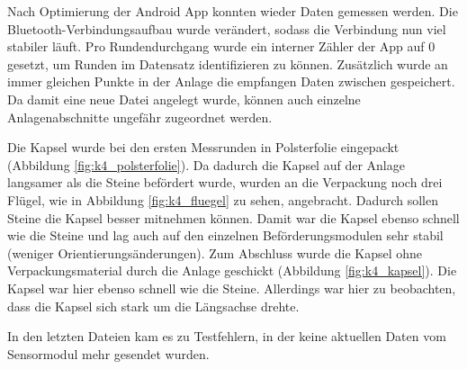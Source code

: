 Nach Optimierung der Android App konnten wieder Daten gemessen werden. Die Bluetooth-Verbindungsaufbau wurde verändert, sodass die Verbindung nun viel stabiler läuft. Pro Rundendurchgang wurde ein interner Zähler der App auf 0 gesetzt, um Runden im Datensatz identifizieren zu können. Zusätzlich wurde an immer gleichen Punkte in der Anlage die empfangen Daten zwischen gespeichert. Da damit eine neue Datei angelegt wurde, können auch einzelne Anlagenabschnitte ungefähr zugeordnet werden.

Die Kapsel wurde bei den ersten Messrunden in Polsterfolie eingepackt (Abbildung \ref{fig:k4_polsterfolie}). Da dadurch die Kapsel auf der Anlage langsamer als die Steine befördert wurde, wurden an die Verpackung noch drei Flügel, wie in Abbildung \ref{fig:k4_fluegel} zu sehen, angebracht. Dadurch sollen Steine die Kapsel besser mitnehmen können. Damit war die Kapsel ebenso schnell wie die Steine und lag auch auf den einzelnen Beförderungsmodulen sehr stabil (weniger Orientierungsänderungen). Zum Abschluss wurde die Kapsel ohne Verpackungsmaterial durch die Anlage geschickt (Abbildung \ref{fig:k4_kapsel}). Die Kapsel war hier ebenso schnell wie die Steine. Allerdings war hier zu beobachten, dass die Kapsel sich stark um die Längsachse drehte. 

In den letzten Dateien kam es zu Testfehlern, in der keine aktuellen Daten vom Sensormodul mehr gesendet wurden.


